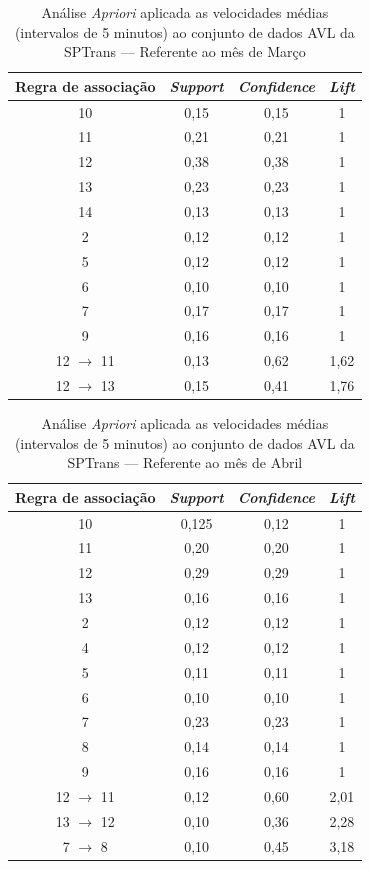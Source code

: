 \documentclass[
	12pt,				%
	oneside,			%
	a4paper,			%
	english,			%
	brazil				%
	]{abntex2ppgsi}
\begin{document}
{{{\begin{apendicesenv}
\begin{table}[!htb]
\centering
\caption {Análise \textit{Apriori} aplicada as velocidades médias (intervalos de 5 minutos) ao conjunto de dados AVL da SPTrans --- Referente ao mês de Março}
\label {tab:aprioriMarch}
\begin{tabular}{c|c|c|c}
\toprule
\textbf{Regra de associação} & \textit{\textbf{Support}} & \textit{\textbf{Confidence}} & \textit{\textbf{Lift}} \\
\midrule 
10 &  0,15 &  0,15 &  1\\ 
\hline 
11 &  0,21 &  0,21 &  1\\ 
\hline 
12 &  0,38 &  0,38 &  1\\ 
\hline 
13 &  0,23 &  0,23 &  1\\ 
\hline 
14 &  0,13 &  0,13 &  1\\ 
\hline 
2 &  0,12 &  0,12 &  1\\ 
\hline 
5 &  0,12 &  0,12 &  1\\ 
\hline 
6 &  0,10 &  0,10 &  1\\ 
\hline 
7 &  0,17 &  0,17 &  1\\ 
\hline 
9 &  0,16 &  0,16 &  1\\ 
\hline 
12 $\rightarrow$ 11 &  0,13 &  0,62 &  1,62\\ 
\hline 
12 $\rightarrow$ 13 &  0,15 &  0,41 &  1,76\\
\bottomrule
\end{tabular}
\end{table}


\begin{table}[!htb]
\centering
\caption {Análise \textit{Apriori} aplicada as velocidades médias (intervalos de 5 minutos) ao conjunto de dados AVL da SPTrans --- Referente ao mês de Abril}
\label {tab:aprioriApril}
\begin{tabular}{c|c|c|c}
\toprule
\textbf{Regra de associação} & \textit{\textbf{Support}} & \textit{\textbf{Confidence}} & \textit{\textbf{Lift}} \\
\midrule 
10 &  0,125 &  0,12 &  1\\
\hline
11 &  0,20 &  0,20 &  1\\
\hline
12 &  0,29 &  0,29 &  1\\
\hline
13 &  0,16 &  0,16 &  1\\
\hline
2 &  0,12 &  0,12 &  1\\
\hline
4 &  0,12 &  0,12 &  1\\
\hline
5 &  0,11 &  0,11 &  1\\
\hline
6 &  0,10 &  0,10 &  1\\
\hline
7 &  0,23 &  0,23 &  1\\
\hline
8 &  0,14 &  0,14 &  1\\
\hline
9 &  0,16 &  0,16 &  1\\
\hline
12  $\rightarrow$ 11 &  0,12 &  0,60 &  2,01\\
\hline
13  $\rightarrow$ 12 &  0,10 &  0,36&  2,28\\
\hline
7  $\rightarrow$ 8 &  0,10 &  0,45 &  3,18\\
\bottomrule
\end{tabular}
\end{table}


\end{apendicesenv}}}}
\end{document}
